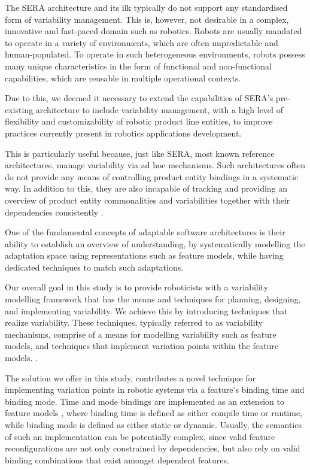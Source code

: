 \documentclass[conference]{IEEEtran}
\begin{document}
The SERA architecture and its ilk typically do not support any standardised form of variability management. This is, however, not desirable in a complex, innovative and fast-paced domain such as robotics. Robots are usually mandated to operate in a variety of environments, which are often unpredictable and human-populated. To operate in such heterogeneous environments, robots possess many unique characteristics in the form of functional and non-functional capabilities, which are reusable in multiple operational contexts.

Due to this, we deemed it necessary to extend the capabilities of SERA's pre-existing architecture to include variability management, with a high level of flexibility and customizability of robotic product line entities, to improve practices currently present in robotics applications development.

This is particularly useful because, just like SERA, most known reference architectures, manage variability via ad hoc mechanisms. Such architectures often do not provide any means of controlling product entity bindings in a systematic way. In addition to this, they are also incapable of tracking and providing an overview of product entity commonalities and variabilities together with their dependencies consistently \cite{var-mod-ind}.

One of the fundamental concepts of adaptable software architectures is their ability to establish an overview of understanding, by systematically modelling the adaptation space using representations such as feature models, while having dedicated techniques to match such adaptations.

Our overall goal in this study is to provide roboticists with a variability modelling framework that has the means and techniques for planning, designing, and implementing variability. We achieve this by introducing techniques that realize variability. These techniques, typically referred to as variability mechanisms, comprise of a means for modelling variability such as feature models, and techniques that implement variation points within the feature models. \cite{var-mod-ind}.

The solution we offer in this study, contributes a novel technique for implementing variation points in robotic systems via a feature's binding time and binding mode. Time and mode bindings are implemented as an extension to feature models \cite{flex-feat-bind}, where binding time is defined as either compile time or runtime, while binding mode is defined as either static or dynamic. Usually, the semantics of such an implementation can be potentially complex, since valid feature reconfigurations are not only constrained by dependencies, but also rely on valid binding combinations that exist amongst dependent features.
\end{document}
